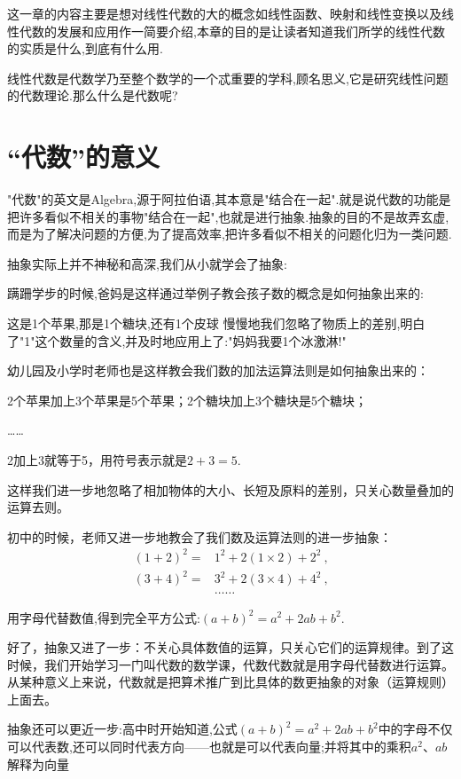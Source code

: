 \documentclass[12pt]{article}
\renewcommand{\,}{\ \text{,}}
\renewcommand{\.}{\ \text{.}}
\begin{document}

这一章的内容主要是想对线性代数的大的概念如线性函数、映射和线性变换以及线性代数的发展和应用作一简要介绍,本章的目的是让读者知道我们所学的线性代数的实质是什么,到底有什么用.

线性代数是代数学乃至整个数学的一个忒重要的学科,顾名思义,它是研究线性问题的代数理论.那么什么是代数呢?

\section{``代数''的意义}
"代数"的英文是Algebra,源于阿拉伯语,其本意是"结合在一起".就是说代数的功能是把许多看似不相关的事物"结合在一起",也就是进行抽象.抽象的目的不是故弄玄虚,而是为了解决问题的方便,为了提高效率,把许多看似不相关的问题化归为一类问题.

抽象实际上并不神秘和高深,我们从小就学会了抽象:

蹒跚学步的时候,爸妈是这样通过举例子教会孩子数的概念是如何抽象出来的:

这是1个苹果,那是1个糖块,还有1个皮球 慢慢地我们忽略了物质上的差别,明白了"1"这个数量的含义,并及时地应用上了:"妈妈我要1个冰激淋!"

幼儿园及小学时老师也是这样教会我们数的加法运算法则是如何抽象出来的：

2个苹果加上3个苹果是5个苹果；2个糖块加上3个糖块是5个糖块；

……

2加上3就等于5，用符号表示就是$2+3=5$.

这样我们进一步地忽略了相加物体的大小、长短及原料的差别，只关心数量叠加的运算去则。

初中的时候，老师又进一步地教会了我们数及运算法则的进一步抽象：
$$\begin{aligned}
    (1+2)^{2}=&1^{2}+2(1 \times 2)+2^{2}\, \\
    (3+4)^{2}=&3^{2}+2(3 \times 4)+4^{2}\, \\
    &……
    \end{aligned}$$

用字母代替数值,得到完全平方公式:$(a+b)^{2}=a^{2}+2 a b+b^{2}$.

好了，抽象又进了一步：不关心具体数值的运算，只关心它们的运算规律。到了这时候，我们开始学习一门叫代数的数学课，代数代数就是用字母代替数进行运算。从某种意义上来说，代数就是把算术推广到比具体的数更抽象的对象（运算规则）上面去。

抽象还可以更近一步:高中时开始知道,公式$(a+b)^{2}=a^{2}+2 a b+b^{2}$中的字母不仅可以代表数,还可以同时代表方向——也就是可以代表向量;并将其中的乘积$a^2$、$ab$解释为向量
\end{document}
